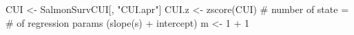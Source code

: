 \begin{Schunk}
\begin{Sinput}
 CUI <- SalmonSurvCUI[, "CUI.apr"]
 CUI.z <- zscore(CUI)
 # number of state = # of regression params (slope(s) + intercept)
 m <- 1 + 1
\end{Sinput}
\end{Schunk}
